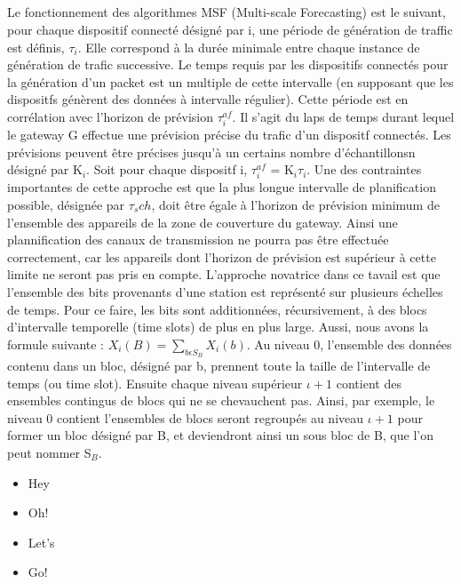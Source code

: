 \documentclass[12pt]{article}
\begin{document}
\subparagraph{} Le fonctionnement des algorithmes MSF (Multi-scale Forecasting) est le suivant, pour chaque dispositif connecté désigné par i, une période de génération de traffic est définis, $\tau_i$. Elle correspond à la durée minimale entre chaque instance de génération de trafic successive.
Le temps requis par les dispositifs connectés pour la génération d'un packet est un multiple de cette intervalle (en supposant que les dispositfs génèrent des données à intervalle régulier).
Cette période est en corrélation avec l'horizon de prévision $\tau^{af}_i$.
Il s'agit du laps de temps durant lequel le gateway G effectue une prévision précise du trafic d'un dispositf connectés. Les prévisions peuvent être précises jusqu'à un certains nombre d'échantillonsn désigné par K$_i$.
Soit pour chaque dispositf i, $\tau^{af}_i$ = K$_i$$\tau_i$.
Une des contraintes importantes de cette approche est que la plus longue intervalle de planification possible, désignée par $\tau_sch$, doit être égale à l'horizon de prévision minimum de l'ensemble des appareils de la zone de couverture du gateway.
Ainsi une plannification des canaux de transmission ne pourra pas être effectuée correctement, car les appareils dont l'horizon de prévision est supérieur à cette limite ne seront pas pris en compte.
L'approche novatrice dans ce tavail est que l'ensemble des bits provenants d'une station est représenté sur plusieurs échelles de temps. Pour ce faire, les bits sont additionnées, récursivement, à des blocs d'intervalle temporelle (time slots) de plus en plus large. 
Aussi, nous avons la formule suivante : $X_{i} (B) = \sum_{b\epsilon S_B} X_{i} (b)$. Au niveau 0, l'ensemble des données contenu dans un bloc, désigné par b, prennent toute la taille de l'intervalle de temps (ou time slot).
Ensuite chaque niveau supérieur $\iota + 1$ contient des ensembles contingus de blocs qui ne se chevauchent pas. Ainsi, par exemple, le niveau 0 contient l'ensembles de blocs seront regroupés au niveau $\iota + 1$ pour former un bloc désigné par B, et deviendront ainsi un sous bloc de B, que l'on peut nommer S$_B$. 





\begin{itemize}

\item Hey

\item Oh!

\item Let’s

\item Go!

\end{itemize}
\end{document}
